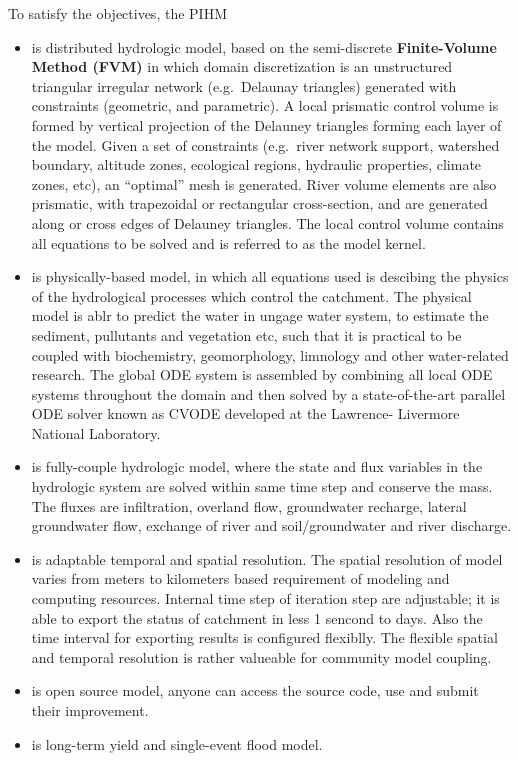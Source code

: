 \documentclass[]{scrbook}
\providecommand{\tightlist}{%
  \setlength{\itemsep}{0pt}\setlength{\parskip}{0pt}}
\begin{document}
To satisfy the objectives, the PIHM

\begin{itemize}
\tightlist
\item
  is distributed hydrologic model, based on the semi-discrete
  \textbf{Finite-Volume Method (FVM)} in which domain discretization is
  an unstructured triangular irregular network (e.g.~Delaunay triangles)
  generated with constraints (geometric, and parametric). A local
  prismatic control volume is formed by vertical projection of the
  Delauney triangles forming each layer of the model. Given a set of
  constraints (e.g.~river network support, watershed boundary, altitude
  zones, ecological regions, hydraulic properties, climate zones, etc),
  an ``optimal'' mesh is generated. River volume elements are also
  prismatic, with trapezoidal or rectangular cross-section, and are
  generated along or cross edges of Delauney triangles. The local
  control volume contains all equations to be solved and is referred to
  as the model kernel.
\item
  is physically-based model, in which all equations used is descibing
  the physics of the hydrological processes which control the catchment.
  The physical model is ablr to predict the water in ungage water
  system, to estimate the sediment, pullutants and vegetation etc, such
  that it is practical to be coupled with biochemistry, geomorphology,
  limnology and other water-related research. The global ODE system is
  assembled by combining all local ODE systems throughout the domain and
  then solved by a state-of-the-art parallel ODE solver known as CVODE
  developed at the Lawrence- Livermore National Laboratory.
\item
  is fully-couple hydrologic model, where the state and flux variables
  in the hydrologic system are solved within same time step and conserve
  the mass. The fluxes are infiltration, overland flow, groundwater
  recharge, lateral groundwater flow, exchange of river and
  soil/groundwater and river discharge.
\item
  is adaptable temporal and spatial resolution. The spatial resolution
  of model varies from meters to kilometers based requirement of
  modeling and computing resources. Internal time step of iteration step
  are adjustable; it is able to export the status of catchment in less 1
  sencond to days. Also the time interval for exporting results is
  configured flexiblly. The flexible spatial and temporal resolution is
  rather valueable for community model coupling.
\item
  is open source model, anyone can access the source code, use and
  submit their improvement.
\item
  is long-term yield and single-event flood model.
\end{itemize}
\end{document}
